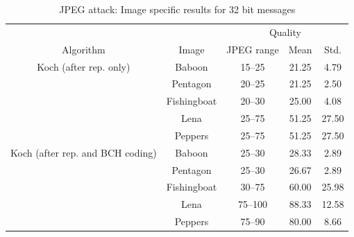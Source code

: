 \documentclass[12pt]{report}
\begin{document}
\begin{table}[!ht]
\tiny
        \begin{center}
                \begin{tabular}{|c|c|c|c|c|} \hline
					& 		& \multicolumn{3}{c|}{Quality} \\ \cline{3-5}
                Algorithm               & Image         & JPEG range   	& Mean          & Std. \\ \hline\hline
                Koch (after rep. only)  & Baboon        & 15--25                 	& 21.25            & 4.79  \\ \cline{2-5}
                			& Pentagon      & 20--25                 	& 21.25            & 2.50  \\ \cline{2-5}
                			& Fishingboat   & 20--30                 	& 25.00            & 4.08  \\ \cline{2-5}
                			& Lena          & 25--75                 	& 51.25            & 27.50  \\ \cline{2-5}
                			& Peppers       & 25--75                 	& 51.25            & 27.50  \\ \hline\hline

                Koch (after rep. and BCH coding)  & Baboon      & 25--30                 & 28.33            & 2.89  \\ \cline{2-5}
                				& Pentagon      & 25--30                 & 26.67            & 2.89  \\ \cline{2-5}
                				& Fishingboat   & 30--75                 & 60.00            & 25.98 \\ \cline{2-5}
                				& Lena          & 75--100                & 88.33            & 12.58  \\ \cline{2-5}
                				& Peppers       & 75--90                 & 80.00            & 8.66  \\ \hline
        \end{tabular}
        \caption{JPEG attack: Image specific results for 32 bit messages}
        \label{tab:imgSpecific32BK32_63_148}
        \end{center}
\end{table}
\normalsize
\end{document}
